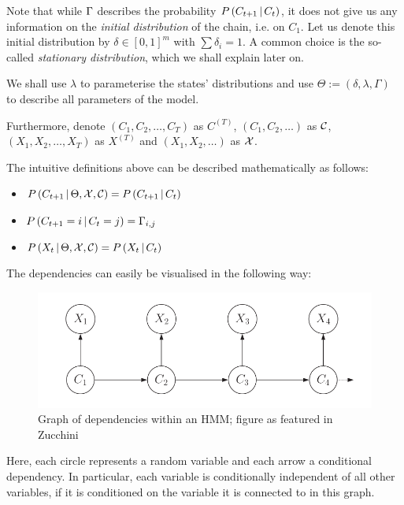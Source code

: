 Note that while $\Gamma$ describes the probability $P\left(C_{t+1} \, | \, C_t\right)$, it does not give us any information on the \textit{initial distribution} of the chain, i.e. on $C_1$. Let us denote this initial distribution by  $\delta \in [0,1]^m$ with $\sum \delta_i = 1$. A common choice is the so-called \textit{stationary distribution}, which we shall explain later on. 

We shall use $\lambda$ to parameterise the states' distributions and use $\Theta := \left(\delta, \lambda, \Gamma \right)$ to describe all parameters of the model.

Furthermore, denote $\left(C_1, C_2, \dots, C_T \right)$ as $C^{(T)}$, $\left(C_1, C_2, \dots \right)$ as $\mathcal{C}$, $\left(X_1, X_2, \dots, X_T \right)$ as $X^{(T)}$ and $\left(X_1, X_2, \dots \right)$ as $\mathcal{X}$. 

The intuitive definitions above can be described mathematically as follows:
\begin{itemize}	
	\item $P\left(C_{t+1} \, | \, \Theta, \mathcal{X}, \mathcal{C}\right) = P\left(C_{t+1} \, | \, C_t\right)$
	
	\item $P\left(C_{t+1} = i \, | \, C_t = j\right) = \Gamma_{i, j} $ 
	
	\item $P\left(X_t \, | \,  \Theta, \mathcal{X}, \mathcal{C}\right) = P\left(X_t \, | \, C_t\right)$
\end{itemize}


The dependencies can easily be visualised in the following way:
\begin{figure}[H]
\includegraphics[width=0.8\linewidth]{img/hmm_dependencies.png}
\caption{Graph of dependencies within an HMM; figure as featured in Zucchini}
\end{figure}
Here, each circle represents a random variable and each arrow a conditional dependency. In particular, each variable is conditionally independent of all other variables, if it is conditioned on the variable it is connected to in this graph. 

